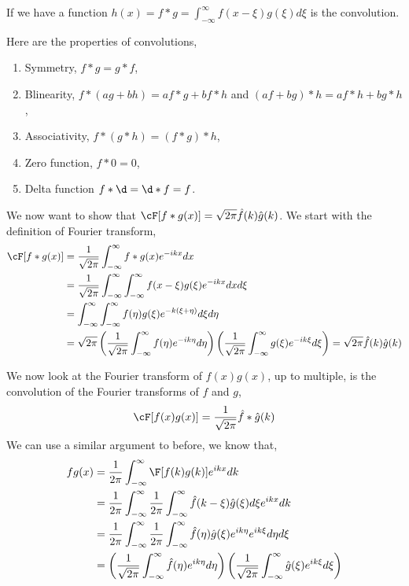 \begin{ndefi}[Convolution]
  If we have a function $h(x) = f * g = \int_{-\infty}^\infty f(x - \xi)g(\xi)d\xi $ is the convolution.
\end{ndefi}
Here are the properties of convolutions,
\begin{enumerate}
  \item Symmetry, $f * g = g * f$,
  \item Blinearity, $f * (ag + bh) = af*g + bf*h$ and $(af + bg)*h = af*h + bg*h$,
  \item Associativity, $f * (g * h) = (f * g) * h$,
  \item Zero function, $f * 0 = 0$,
  \item Delta function $f * \d = \d * f = f$.
\end{enumerate}

We now want to show that $\cF [f * g (x)] = \sqrt{2\pi} \hat f (k) \hat g (k)$. We start with the definition of Fourier transform,
\begin{align*}
  \cF[f * g (x)] &= \frac{1}{\sqrt{2\pi}}\int_{-\infty}^\infty f * g(x) e^{-ikx}dx \\
  &= \frac{1}{\sqrt{2\pi}}\int_{-\infty}^\infty \int_{-\infty}^\infty f(x - \xi)g(\xi) e^{-ikx} dx d\xi \\
  &= \int_{-\infty}^\infty \int_{-\infty}^\infty f(\eta)g(\xi) e^{-k(\xi + \eta)}d\xi d\eta \\
  &= \sqrt{2\pi} \left( \frac{1}{\sqrt{2\pi}}\int_{-\infty}^\infty f(\eta) e^{-ik\eta}d\eta\right)\left( \frac{1}{\sqrt{2\pi}}\int_{-\infty}^\infty g(\xi) e^{-ik\xi}d\xi \right) = \sqrt{2\pi}\hat f(k)\hat g(k)
\end{align*}

\noindent
We now look at the Fourier transform of $f(x)g(x)$, up to multiple, is the convolution of the Fourier transforms of $f$ and $g$,
$$ \cF[f(x)g(x)] = \frac{1}{\sqrt{2\pi}} \hat f * \hat g(k) $$
We can use a similar argument to before, we know that,
\begin{align*}
  fg(x) &= \frac{1}{2\pi}\int_{-\infty}^\infty \F[f(k)g(k)] e^{ikx}dk \\
  &= \frac{1}{2\pi}\int_{-\infty}^\infty  \frac{1}{2\pi} \int_{-\infty}^\infty \hat f(k - \xi) \hat g(\xi)d\xi e^{ikx}dk \\
  &= \frac{1}{2\pi}\int_{-\infty}^\infty  \frac{1}{2\pi} \int_{-\infty}^\infty \hat f(\eta)\hat g(\xi) e^{ik\eta}e^{ik\xi}d\eta d\xi \\
  &= \left(\frac{1}{\sqrt{2\pi}} \int_{-\infty}^\infty \hat f(\eta) e^{ik\eta} d\eta \right)\left(\frac{1}{\sqrt{2\pi}} \int_{-\infty}^\infty \hat g(\xi) e^{ik\xi} d\xi \right)
\end{align*}

